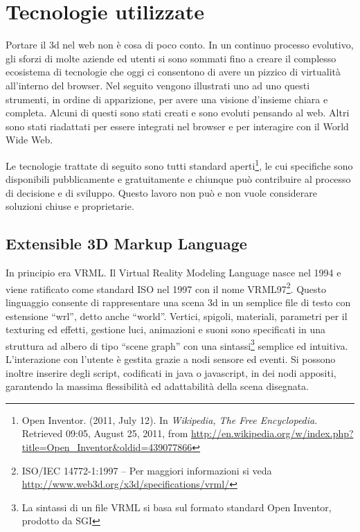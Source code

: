 \chapter{Tecnologie utilizzate}                 

Portare il 3d nel web non è cosa di poco conto. In un continuo processo evolutivo, gli sforzi di molte aziende ed utenti si sono sommati fino a creare il complesso ecosistema di tecnologie che oggi ci consentono di avere un pizzico di virtualità all'interno del browser. Nel seguito vengono illustrati uno ad uno questi strumenti, in ordine di apparizione, per avere una visione d'insieme chiara e completa. Alcuni di questi sono stati creati e sono evoluti pensando al web. Altri sono stati riadattati per essere integrati nel browser e per interagire con il World Wide Web.
 
Le tecnologie trattate di seguito sono tutti standard aperti\footnote{Open Inventor. (2011, July 12). In \textit{Wikipedia, The Free Encyclopedia}. Retrieved 09:05, August 25, 2011, from \url{http://en.wikipedia.org/w/index.php?title=Open_Inventor&oldid=439077866}}, le cui specifiche sono disponibili pubblicamente e gratuitamente e chiunque può contribuire al processo di decisione e di sviluppo. Questo lavoro non può e non vuole considerare soluzioni chiuse e proprietarie.

\clearpage
\section{Extensible 3D Markup Language}
In principio era VRML. Il Virtual Reality Modeling Language nasce nel 1994 e viene ratificato come standard ISO nel 1997 con il nome VRML97\footnote{ISO/IEC 14772-1:1997 – Per maggiori informazioni si veda \url{http://www.web3d.org/x3d/specifications/vrml/}}. Questo linguaggio consente di rappresentare una scena 3d in un semplice file di testo con estensione “wrl”, detto anche “world”. Vertici, spigoli, materiali, parametri per il texturing ed effetti, gestione luci, animazioni e suoni sono specificati in una struttura ad albero di tipo “scene graph” con una sintassi\footnote{La sintassi di un file VRML si basa sul formato standard Open Inventor, prodotto da SGI} semplice ed intuitiva. L'interazione con l'utente è gestita grazie a nodi sensore ed eventi. Si possono inoltre inserire degli script, codificati in java o javascript, in dei nodi appositi, garantendo la massima flessibilità ed adattabilità della scena disegnata.

